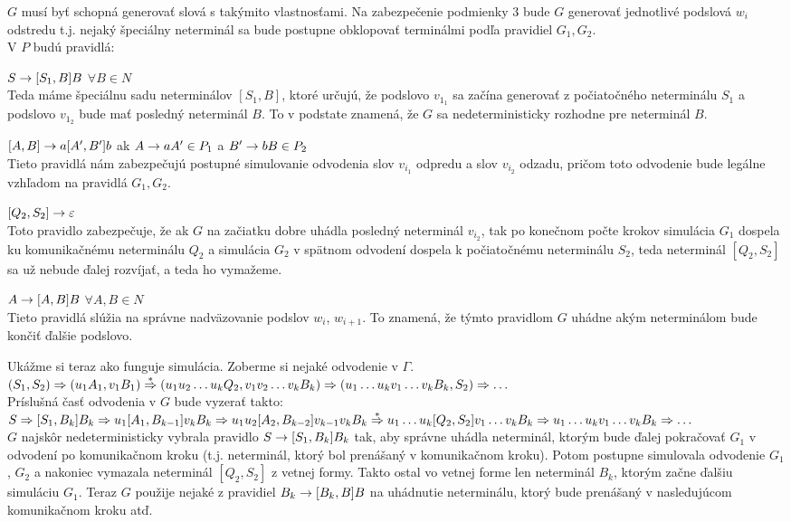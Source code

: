 \begin{dokaz}
  $G$ musí byť schopná generovať slová s takýmito vlastnosťami. Na
  zabezpečenie podmienky 3 bude $G$ generovať jednotlivé podslová
  $w_i$ odstredu t.j. nejaký špeciálny neterminál sa bude postupne
  obklopovať terminálmi podľa pravidiel $G_1,G_2$.
  \\ V $P$ budú pravidlá:
  \begin{description}
    \item{$S\rightarrow [S_1,B] B$  $\forall B\in N$} \\Teda máme špeciálnu
    sadu neterminálov $[S_1,B]$, ktoré určujú, že podslovo $v_{1_1}$
    sa začína generovať z počiatočného neterminálu $S_1$ a podslovo
    $v_{1_2}$ bude mať posledný neterminál $B$. To v podstate znamená,
    že $G$ sa nedeterministicky rozhodne pre neterminál $B$.
    \item{$[A,B]\rightarrow a[A',B']b$  ak $A\rightarrow aA'\in P_1$ a $B'\rightarrow bB\in
    P_2$} \\ Tieto pravidlá nám zabezpečujú postupné simulovanie
    odvodenia slov $v_{i_1}$ odpredu a slov $v_{i_2}$ odzadu, pričom
    toto odvodenie bude legálne vzhľadom na pravidlá $G_1,G_2$.
    \item{$[Q_2,S_2]\rightarrow\varepsilon$} \\ Toto pravidlo zabezpečuje, že
    ak $G$ na začiatku dobre uhádla posledný neterminál $v_{i_2}$, tak
    po konečnom počte krokov simulácia $G_1$ dospela ku komunikačnému
    neterminálu $Q_2$ a simulácia $G_2$ v spätnom odvodení dospela k
    počiatočnému neterminálu $S_2$, teda neterminál $[Q_2,S_2]$ sa už
    nebude ďalej rozvíjať, a teda ho vymažeme.
    \item{$A\rightarrow [A,B]B$  $\forall A,B\in N$} \\ Tieto pravidlá slúžia na
    správne nadväzovanie podslov $w_i$, $w_{i+1}$. To znamená, že
    týmto pravidlom $G$ uhádne akým neterminálom bude končiť ďalšie
    podslovo.
  \end{description}
  Ukážme si teraz ako funguje simulácia. Zoberme si nejaké odvodenie
  v $\Gamma$.
  \\ $(S_1,S_2)\Rightarrow (u_1A_1,v_1B_1)\overset{*}{\Rightarrow} (u_1u_2\dots u_kQ_2,v_1v_2\dots
  v_kB_k)\Rightarrow (u_1\dots u_kv_1\dots v_kB_k,S_2)\Rightarrow\dots$
  \\ Príslušná časť odvodenia v $G$ bude vyzerať takto:
  \\ $S\Ra [S_1,B_k]B_k\Ra u_1[A_1,B_{k-1}]v_kB_k\Ra u_1u_2[A_2,B_{k-2}]v_{k-1}v_kB_k
  \overset{*}\Ra\newline u_1\dots u_k[Q_2,S_2]v_1\dots v_kB_k\Ra
  u_1\dots u_kv_1\dots v_kB_k\Ra\dots$
  \\ $G$ najskôr nedeterministicky vybrala pravidlo $S\rightarrow
  [S_1,B_k]B_k$ tak, aby správne uhádla neterminál, ktorým bude
  ďalej pokračovať $G_1$ v odvodení po komunikačnom kroku (t.j.
  neterminál, ktorý bol prenášaný v komunikačnom kroku). Potom
  postupne simulovala odvodenie $G_1$, $G_2$ a nakoniec vymazala
  neterminál $[Q_2,S_2]$ z vetnej formy. Takto ostal vo vetnej forme
  len neterminál $B_k$, ktorým začne ďalšiu simuláciu $G_1$. Teraz
  $G$ použije nejaké z pravidiel $B_k\rightarrow [B_k,B]B$ na uhádnutie
  neterminálu, ktorý bude prenášaný v nasledujúcom komunikačnom
  kroku atď.


\end{dokaz}

